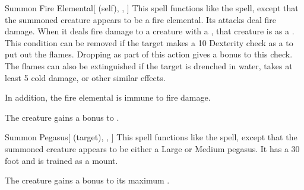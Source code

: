 \lowercase{\hypertarget{spell:Summon Fire Elemental}{}}\label{spell:Summon Fire Elemental}
\begin{attuneability}[Rank 5]{\hypertarget{spell:Summon Fire Elemental}{Summon Fire Elemental}}[ (self), , ]
This spell functions like the  spell, except that the summoned creature appears to be a fire elemental.
Its attacks deal fire damage.
When it deals fire damage to a creature with a , that creature is  as a .
This condition can be removed if the target makes a  10 Dexterity check as a  to put out the flames.
Dropping  as part of this action gives a  bonus to this check.
The flames can also be extinguished if the target is drenched in water, takes at least 5 cold damage, or other similar effects.

In addition, the fire elemental is immune to fire damage.

\rankline
{} The creature gains a  bonus to .
\end{attuneability}
\vspace{0.25em}



\lowercase{\hypertarget{spell:Summon Pegasus}{}}\label{spell:Summon Pegasus}
\begin{attuneability}[Rank 5]{\hypertarget{spell:Summon Pegasus}{Summon Pegasus}}[ (target), , ]
This spell functions like the  spell, except that the summoned creature appears to be either a Large or Medium pegasus.
It has a 30 foot  and is trained as a mount.

\rankline
{} The creature gains a  bonus to its maximum .
\end{attuneability}
\vspace{0.25em}



